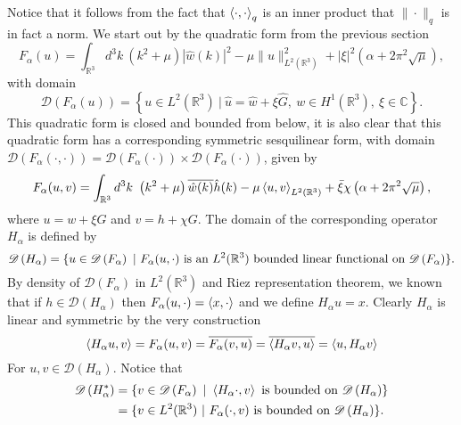 \documentclass[a4paper,11pt]{article}
\newcommand{\dom}[1]{\mathscr D\left(#1\right)}
\newcommand{\R}{\mathbb{R}}
\newcommand{\C}{\mathbb{C}}
\numberwithin{equation}{section}
\begin{document}
Notice that it follows from the fact that $ \braket{\cdot,\cdot}_q $ is an inner product that $ \|\cdot\|_q $ is in fact a norm.
We start out by the quadratic form from the previous section
\begin{equation}
F_\alpha(u)=\int_{\R^3} d^3k\ \left(k^2+\mu\right)|\hat{w}(k)|^2-\mu\|u\|^2_{L^2(\R^3)}+|\xi|^2\left(\alpha+2\pi^2\sqrt{\mu}\right),
\end{equation}
with domain\begin{equation}
\dom{F_\alpha(u)}=\left\{u\in L^2(\R^3) \ |\ \hat{u}=\hat{w}+\xi\hat{G},\ w\in H^1(\R^3),\ \xi\in\C \right\}.
\end{equation}
This quadratic form is closed and bounded from below, it is also clear that this quadratic form has a corresponding symmetric sesquilinear form, with domain\\ $ \dom{F_\alpha(\cdot,\cdot)}=\dom{F_\alpha(\cdot)}\times\dom{F_\alpha(\cdot
	)} $, given by\begin{equation}
F_\alpha(u,v)=\int_{\R^3} d^3k\ \left(k^2+\mu\right)\overline{\hat{w}(k)}\hat{h}(k)-\mu\braket{u,v}_{L^2(\R^3)}+\bar{\xi}\chi\left(\alpha+2\pi^2\sqrt{\mu}\right),
\end{equation}
where $ u=w+\xi G $ and $ v=h+\chi G $. The domain of the corresponding operator $ H_\alpha $ is defined by \begin{equation}
\dom{H_\alpha}=\{u\in \dom{F_\alpha}\ |\ F_\alpha(u,\cdot) \text{ is an $ L^2(\R^3) $ bounded linear functional on }\dom{F_\alpha} \}.
\end{equation}
By density of $ \dom{F_\alpha} $ in $ L^2(\R^3) $ and Riez representation theorem, we known that if $ h\in\dom{H_\alpha} $ then $ F_\alpha(u,\cdot)=\braket{x,\cdot} $ and we define $ H_\alpha u=x $. Clearly $ H_\alpha $ is linear and symmetric by the very construction\begin{equation}
\braket{H_\alpha u,v}=F_\alpha(u,v)=\overline{F_\alpha(v,u)}=\overline{\braket{H_\alpha v, u}}=\braket{u,H_\alpha v}
\end{equation} 
For $ u,v \in\dom{H_\alpha} $. Notice that \begin{equation}
\begin{aligned}
\dom{H_\alpha^*}&=\{v\in \dom{F_\alpha}\ |\ \braket{H_\alpha \cdot, v}\text{ is bounded on } \dom{H_\alpha} \}\\&=\{v\in L^2(\R^3)\ |\ F_\alpha(\cdot,v) \text{ is bounded on } \dom{H_\alpha} \}.
\end{aligned}
\end{equation}
\end{document}
